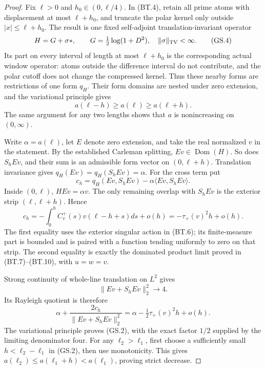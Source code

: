 \begin{proof}
Fix \(\ell>0\) and \(h_0\in(0,\ell/4)\).
In (BT.4), retain all prime atoms with displacement at most
\(\ell+h_0\), and truncate the polar kernel only outside
\(|x|\leq\ell+h_0\).  The result is one fixed self-adjoint
translation-invariant operator
\[
 H=G+\sigma*,\qquad G=\tfrac12\log(1+D^2),
                     \quad\|\sigma\|_{\rm TV}<\infty.    \tag{GS.4}
\]
Its part on every interval of length at most \(\ell+h_0\)
is the corresponding actual window operator: atoms outside
the difference interval do not contribute, and the polar
cutoff does not change the compressed kernel.
Thus these nearby forms are restrictions of one form \(q_H\).
Their form domains are nested under zero extension, and
the variational principle gives
\[
                  a(\ell-h)\geq a(\ell)\geq a(\ell+h).
                                                               \tag{GS.5}
\]
The same argument for any two lengths shows that \(a\) is
nonincreasing on \((0,\infty)\).

Write \(\alpha=a(\ell)\), let \(E\) denote zero extension,
and take the real normalized \(v\) in the statement.
By the established Carleman splitting, \(Ev\in\operatorname{Dom}(H)\).
So does \(S_hEv\), and their sum is an admissible form vector
on \((0,\ell+h)\).
Translation invariance gives
\(q_H(Ev)=q_H(S_hEv)=\alpha\).
For the cross term put
\[
 c_h=q_H(Ev,S_hEv)-\alpha\langle Ev,S_hEv\rangle.
\]
Inside \((0,\ell)\), \(HEv=\alpha v\).
The only remaining overlap with \(S_hEv\) is the exterior
strip \((\ell,\ell+h)\).  Hence
\[
 c_h=-\int_0^h C_v^+(s)v(\ell-h+s)ds+o(h)
                 =-\tau_+(v)^2h+o(h).                  \tag{GS.6}
\]
The first equality uses the exterior singular action in
(BT.6); its finite-measure part is bounded and is paired
with a function tending uniformly to zero on that strip.
The second equality is exactly the dominated product limit
proved in (BT.7)--(BT.10), with \(u=w=v\).

Strong continuity of whole-line translation on \(L^2\)
gives
\[
                       \|Ev+S_hEv\|_2^2\longrightarrow4.
\]
Its Rayleigh quotient is therefore
\[
 \alpha+\frac{2c_h}{\|Ev+S_hEv\|_2^2}
                   =\alpha-\tfrac12\tau_+(v)^2h+o(h).
                                                               \tag{GS.7}
\]
The variational principle proves (GS.2), with the exact
factor \(1/2\) supplied by the limiting denominator four.
For any \(\ell_2>\ell_1\), first choose a sufficiently small
\(h<\ell_2-\ell_1\) in (GS.2), then use monotonicity.
This gives \(a(\ell_2)\leq a(\ell_1+h)<a(\ell_1)\),
proving strict decrease.


\end{proof}
